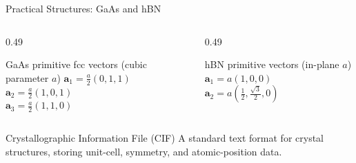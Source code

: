 \documentclass[8pt]{beamer}
\begin{document}
\begin{frame}{Practical Structures: GaAs and hBN}
	\vspace{0.1cm}
	\begin{columns}[T]
		\begin{column}{0.49\textwidth}
			\begin{block}{GaAs primitive fcc vectors (cubic parameter $a$)}
				\centering\footnotesize
				$\mathbf{a}_1=\frac{a}{2}(0,1,1)$\\
				$\mathbf{a}_2=\frac{a}{2}(1,0,1)$\\
				$\mathbf{a}_3=\frac{a}{2}(1,1,0)$
			\end{block}
		\end{column}
		\begin{column}{0.49\textwidth}
			\begin{block}{hBN primitive vectors (in-plane $a$)}
				\centering\footnotesize
				$\mathbf{a}_1=a(1,0,0)$\\
				$\mathbf{a}_2=a\left(\frac{1}{2},\frac{\sqrt{3}}{2},0\right)$
			\end{block}
		\end{column}
	\end{columns}
	\vspace{0.05cm}
	\begin{block}{Crystallographic Information File (CIF)}
		A standard text format for crystal structures, storing unit-cell, symmetry,
		and atomic-position data.
	\end{block}
\end{frame}
\end{document}
